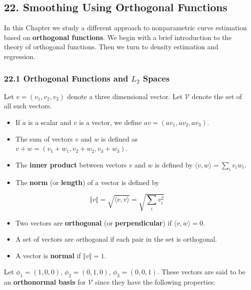 \subsection{22. Smoothing Using Orthogonal Functions}\label{smoothing-using-orthogonal-functions}

    In this Chapter we study a different approach to nonparametric curve
estimation based on \textbf{orthogonal functions}. We begin with a brief
introduction to the theory of orthogonal functions. Then we turn to
density estimation and regression.

\subsubsection{\texorpdfstring{22.1 Orthogonal Functions and \(L_2\) Spaces}{22.1 Orthogonal Functions and L\_2 Spaces}}\label{orthogonal-functions-and-l_2-spaces}

    Let \(v = (v_1, v_2, v_3)\) denote a three dimensional vector. Let
\(\mathcal{V}\) denote the set of all such vectors.

\begin{itemize}[tightlist]
\item
  If \(a\) is a scalar and \(v\) is a vector, we define
  \(av = (av_1, av_2, av_3)\).
\item
  The sum of vectors \(v\) and \(w\) is defined as
  \(v + w = (v_1 + w_1, v_2 + w_2, v_3 + w_3)\).
\item
  The \textbf{inner product} between vectors \(v\) and \(w\) is defined
  by \(\langle v, w \rangle = \sum_i v_i w_i\).
\item
  The \textbf{norm} (or \textbf{length}) of a vector is defined by
\end{itemize}

\[ \Vert v \Vert = \sqrt{\langle v, v \rangle} = \sqrt{\sum_i v_i^2 }\]

\begin{itemize}[tightlist]
\item
  Two vectors are \textbf{orthogonal} (or \textbf{perpendicular}) if
  \(\langle v, w \rangle = 0\).
\item
  A set of vectors are orthogonal if each pair in the set is orthogonal.
\item
  A vector is \textbf{normal} if \(\Vert v \Vert = 1\).
\end{itemize}

Let \(\phi_1 = (1, 0, 0)\), \(\phi_2 = (0, 1, 0)\),
\(\phi_3 = (0, 0, 1)\). These vectors are said to be an
\textbf{orthonormal basis} for \(\mathcal{V}\) since they have the
following properties:

